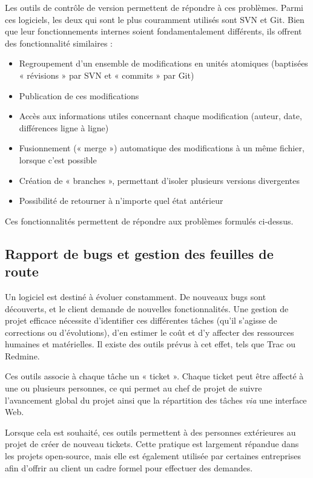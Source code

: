 Les outils de contrôle de version permettent de répondre à ces problèmes. Parmi ces logiciels, les deux qui sont le plus couramment utilisés sont SVN et Git. Bien que leur fonctionnements internes soient fondamentalement différents, ils offrent des fonctionnalité similaires :

\begin{itemize}
\item Regroupement d’un ensemble de modifications en unités atomiques (baptisées « révisions » par SVN et « commits » par Git)
\item Publication de ces modifications
\item Accès aux informations utiles concernant chaque modification (auteur, date, différences ligne à ligne)
\item Fusionnement (« merge ») automatique des modifications à un même fichier, lorsque c’est possible
\item Création de « branches », permettant d’isoler plusieurs versions divergentes
\item Possibilité de retourner à n’importe quel état antérieur
\end{itemize}

Ces fonctionnalités permettent de répondre aux problèmes formulés ci-dessus.

\subsection{Rapport de bugs et gestion des feuilles de route}

Un logiciel est destiné à évoluer constamment. De nouveaux bugs sont découverts, et le client demande de nouvelles fonctionnalités. Une gestion de projet efficace nécessite d’identifier ces différentes tâches (qu’il s’agisse de corrections ou d’évolutions), d’en estimer le coût et d’y affecter des ressources humaines et matérielles. Il existe des outils prévus à cet effet, tels que Trac ou Redmine.

Ces outils associe à chaque tâche un « ticket ». Chaque ticket peut être affecté à une ou plusieurs personnes, ce qui permet au chef de projet de suivre l’avancement global du projet ainsi que la répartition des tâches \textit{via} une interface Web.

Lorsque cela est souhaité, ces outils permettent à des personnes extérieures au projet de créer de nouveau tickets. Cette pratique est largement répandue dans les projets open-source, mais elle est également utilisée par certaines entreprises afin d’offrir au client un cadre formel pour effectuer des demandes.

